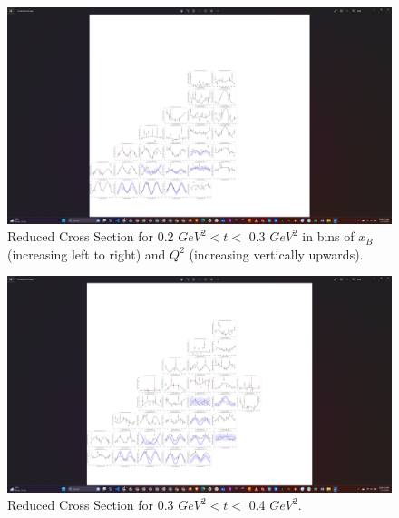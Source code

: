 \begin{figure}[ht]
\centering
\includegraphics[trim={14.6cm 4cm 27.2cm 4cm},clip,width=\textwidth]{Chapters/Ch4-BaseAnalysis/bin_by_bin_cross_sections/pics_screenshots/t_2.png}
\caption[Reduced Cross Section for 0.2 $GeV^2 < t <$ 0.3 $ GeV^2$]{Reduced Cross Section for 0.2 $ GeV^2 < t <$ 0.3 $GeV^2$ in bins of $x_B$ (increasing left to right) and $Q^2$ (increasing vertically upwards). }
\label{fig:combined_t0.2}
\end{figure}


\begin{figure}[ht]
\centering
\includegraphics[trim={14.1cm 4cm 27.2cm 4cm},clip,width=\textwidth]{Chapters/Ch4-BaseAnalysis/bin_by_bin_cross_sections/pics_screenshots/t_3.png}
\caption[Reduced Cross Section for 0.3 $GeV^2 < t <$ 0.4 $ GeV^2$]{Reduced Cross Section for 0.3 $ GeV^2 < t <$ 0.4 $GeV^2$.}
\label{fig:combined_t0.3}
\end{figure}


